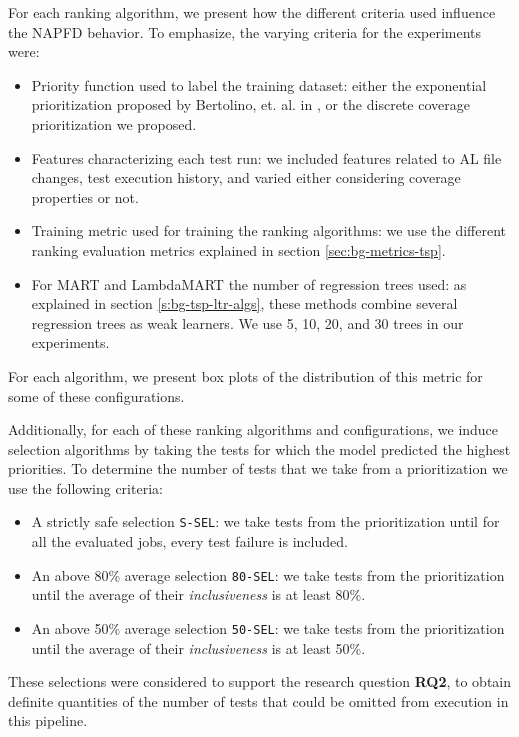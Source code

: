 For each ranking algorithm, we present how the different criteria used influence the
NAPFD behavior. To emphasize, the varying criteria for the experiments were:
\begin{itemize}
    \item Priority function used to label the training dataset: either the exponential prioritization proposed by Bertolino, et. al. in \cite{Bertolino2020LearningtoRankVR}, or the discrete coverage prioritization we proposed.
    \item Features characterizing each test run: we included features related to AL file changes, test execution history, and varied either considering coverage properties or not.
    \item Training metric used for training the ranking algorithms: we use the different ranking evaluation metrics explained in section \ref{sec:bg-metrics-tsp}.
    \item For MART and LambdaMART the number of regression trees used: as explained in section \ref{s:bg-tsp-ltr-algs}, these methods combine several regression trees as weak learners. We use 5, 10, 20, and 30 trees in our experiments.
\end{itemize}

For each algorithm, we present box plots of the distribution of this metric for some of these configurations. 

Additionally, for each of these ranking algorithms and configurations, we induce selection algorithms by taking the tests
for which the model predicted the highest priorities. To determine the number of tests that we take
from a prioritization we use the following criteria:

\begin{itemize}
    \item A strictly safe selection \texttt{S-SEL}: we take tests from the prioritization until for all the evaluated jobs, every test failure is included.
    \item An above 80\% average selection \texttt{80-SEL}: we take tests from the prioritization until the average of their \emph{inclusiveness} is at least 80\%.
    \item An above 50\% average selection \texttt{50-SEL}: we take tests from the prioritization until the average of their \emph{inclusiveness} is at least 50\%.
\end{itemize}

These selections were considered to support the research question \textbf{RQ2}, to obtain
definite quantities of the number of tests that could be omitted from execution
in this pipeline.

